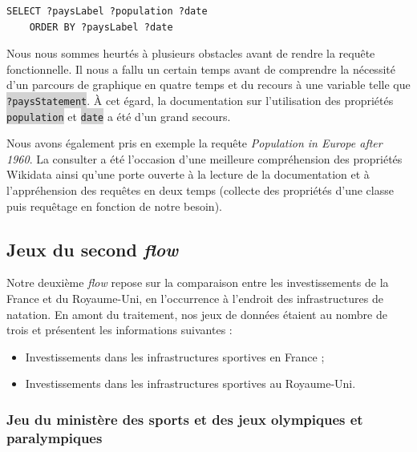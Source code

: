 \documentclass[hidelinks, 12pt]{article}
\newcommand{\code}[1]{\colorbox{LightGray}{\texttt{#1}}}
\begin{document}
\begin{lstlisting}[language=SPARQL]
	SELECT ?paysLabel ?population ?date
	ORDER BY ?paysLabel ?date
\end{lstlisting}

Nous nous sommes heurtés à plusieurs obstacles avant de rendre la requête fonctionnelle. Il nous a fallu un certain temps avant de comprendre la nécessité d'un parcours de graphique en quatre temps et du recours à une variable telle que \code{?paysStatement}. À cet égard, la documentation sur l'utilisation des propriétés \code{population}\autocite{wikipop} et \code{date}\autocite{wikidate} a été d'un grand secours. 

Nous avons également pris en exemple la requête \emph{Population in Europe after 1960}\autocite{wiki1960}. La consulter a été l'occasion d'une meilleure compréhension des propriétés Wikidata ainsi qu'une porte ouverte à la lecture de la documentation et à l'appréhension des requêtes en deux temps (collecte des propriétés d'une classe puis requêtage en fonction de notre besoin).





















\subsection{Jeux du second \emph{flow}}

Notre deuxième \emph{flow} repose sur la comparaison entre les investissements de la France et du Royaume-Uni, en l'occurrence à l'endroit des infrastructures de natation. En amont du traitement, nos jeux de données étaient au nombre de trois et présentent les informations suivantes :

\begin{itemize}
	\item Investissements dans les infrastructures sportives en France\autocite{ministere} ;
	\item Investissements dans les infrastructures sportives au Royaume-Uni\autocite{ru}.
\end{itemize}


\subsubsection{Jeu du ministère des sports et des jeux olympiques et paralympiques}
\end{document}
